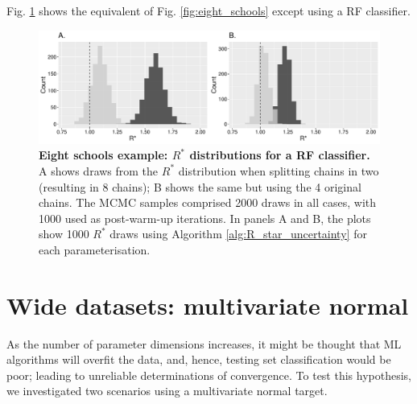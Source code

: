 \documentclass[ba]{imsart}
\numberwithin{equation}{section}
\theoremstyle{plain}
\begin{document}
\begin{supplement}
		Fig. \ref{fig:eight_schools_rf} shows the equivalent of Fig. \ref{fig:eight_schools} except using a RF classifier.
		
		\begin{figure}[!htb]
			\centerline{\includegraphics[width=1\textwidth]{eight_schools_rf.pdf}}
			\caption{\textbf{Eight schools example: $R^*$ distributions for a RF classifier.} A shows draws from the $R^*$ distribution when splitting chains in two (resulting in 8 chains); B shows the same but using the 4 original chains. The MCMC samples comprised 2000 draws in all cases, with 1000 used as post-warm-up iterations. In panels A and B, the plots show 1000 $R^*$ draws using Algorithm \ref{alg:R_star_uncertainty} for each parameterisation.}
			\label{fig:eight_schools_rf}
		\end{figure}
		
		
		
		
		\section{Wide datasets: multivariate normal}\label{sec:wide}
		As the number of parameter dimensions increases, it might be thought that ML algorithms will overfit the data, and, hence, testing set classification would be poor; leading to unreliable determinations of convergence. To test this hypothesis, we investigated two scenarios using a multivariate normal target.
		

\end{supplement}
\end{document}
